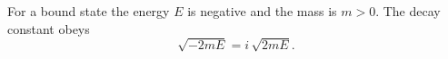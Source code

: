 \documentclass{article}
\begin{document}
For a bound state the energy $E$ is negative and the mass is $m>0$. The decay constant obeys
\begin{equation}
\sqrt{-2mE} = i\,\sqrt{2mE} .
\label{eq:kappa}
\end{equation}
\end{document}
